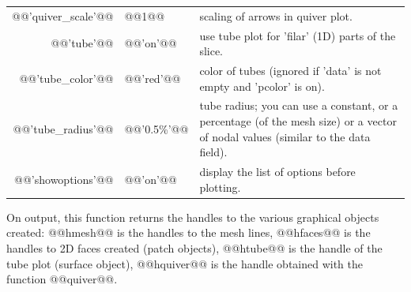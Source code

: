 \begin{cmddescription}
\begin{center}
\begin{tabular}{|rlp{}|}
  @@'quiver_scale'@@   & @@1@@        & scaling of arrows in quiver plot.\\
  @@'tube'@@          & @@'on'@@     & use tube plot for 'filar' (1D) parts of the slice.\\
  @@'tube_color'@@     & @@'red'@@    & color of tubes (ignored if 'data' is not empty and 'pcolor' is on).\\
  @@'tube_radius'@@    & @@'0.5\%'@@   & tube radius; you can use a constant, or a percentage (of the mesh size) or a vector of nodal values (similar to the data field).\\
  @@'showoptions'@@  & @@'on'@@      & display the list of options before plotting.\\
    \hline
  \end{tabular}
\end{center}

On output, this function returns the handles to the various
graphical objects created: @@hmesh@@ is the handles to the mesh
lines, @@hfaces@@ is the handles to 2D faces created (patch objects), @@htube@@
is the handle of the tube plot (surface object), @@hquiver@@ is the handle obtained with the \mlab function @@quiver@@.
\end{cmddescription}

